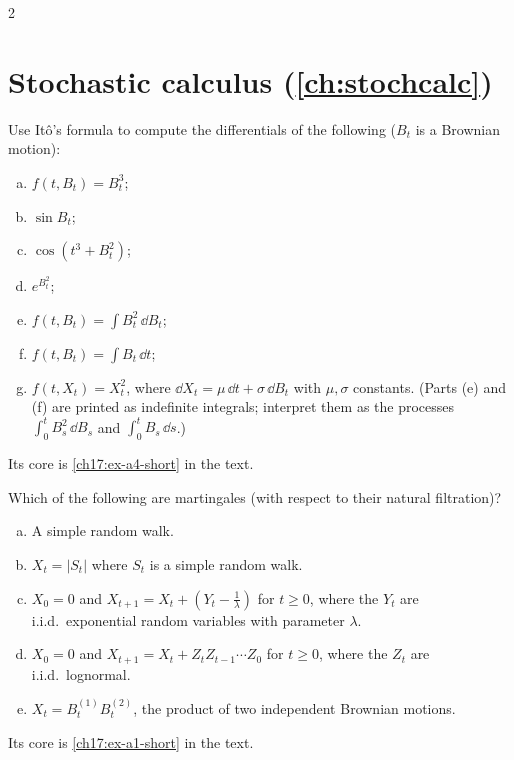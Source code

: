 \begin{paracol}{2}
\section{Stochastic calculus (\cref{ch:stochcalc})}\label{exam:ch17}

\begin{exercise}\label{ch17:ex-a4}
Use It\^o's formula to compute the differentials of the following ($B_t$ is a Brownian motion):
\begin{enumerate}[(a)]
  \item $f(t,B_t)=B_t^3$;
  \item $\sin B_t$;
  \item $\cos(t^3+B_t^2)$;
  \item $e^{B_t^2}$;
  \item $f(t,B_t)=\int B_t^2\,\dd B_t$;
  \item $f(t,B_t)=\int B_t\,\dd t$;
  \item $f(t,X_t)=X_t^2$, where $\dd X_t=\mu\,\dd t+\sigma\,\dd B_t$ with $\mu,\sigma$ constants. (Parts (e) and (f) are printed as indefinite integrals; interpret them as the processes $\int_0^tB_s^2\,\dd B_s$ and $\int_0^tB_s\,\dd s$.)
\end{enumerate}
Its core is \cref{ch17:ex-a4-short} in the text.
\end{exercise}

\begin{exercise}\label{ch17:ex-a1}
Which of the following are martingales (with respect to their natural filtration)?
\begin{enumerate}[(a)]
  \item A simple random walk.
  \item $X_t=|S_t|$ where $S_t$ is a simple random walk.
  \item $X_0=0$ and $X_{t+1}=X_t+(Y_t-\tfrac1\lambda)$ for $t\ge0$, where the $Y_t$ are i.i.d.\ exponential
      random variables with parameter $\lambda$.
  \item $X_0=0$ and $X_{t+1}=X_t+Z_tZ_{t-1}\cdots Z_0$ for $t\ge0$, where the $Z_t$ are i.i.d.\ lognormal.
  \item $X_t=B^{(1)}_tB^{(2)}_t$, the product of two independent Brownian motions.
\end{enumerate}
Its core is \cref{ch17:ex-a1-short} in the text.
\end{exercise}


\end{paracol}

